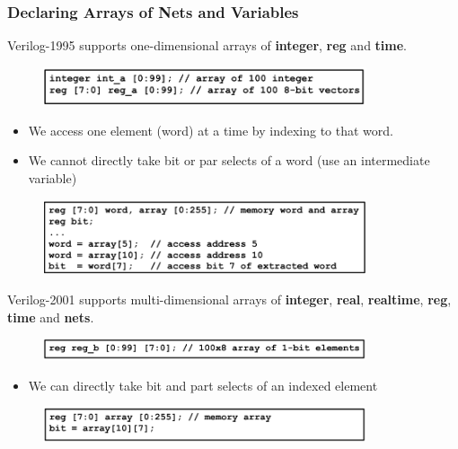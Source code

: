 \documentclass[t, notes, xcolor=table]{beamer}
\begin{document}
\begin{frame}
\frametitle{Declaring Arrays of Nets and Variables}
\scriptsize{
Verilog-1995 supports one-dimensional arrays of \textbf{integer}, \textbf{reg} and \textbf{time}.
\begin{figure}
    \includegraphics[width=0.85\textwidth, left]{img/04_array0.png}
\end{figure}

\begin{itemize}
\item We access one element (word) at a time by indexing to that word.
\item We cannot directly take bit or par selects of a word (use an intermediate variable)
\end{itemize}
\begin{figure}
    \includegraphics[width=0.85\textwidth, left]{img/04_array1.png}
\end{figure}

Verilog-2001 supports multi-dimensional arrays of \textbf{integer}, \textbf{real}, \textbf{realtime}, \textbf{reg}, \textbf{time} and \textbf{nets}.
\begin{figure}
    \includegraphics[width=0.85\textwidth, left]{img/04_array2.png}
\end{figure}
\begin{itemize}
\item We can directly take bit and part selects of an indexed element
\end{itemize}
\begin{figure}
    \includegraphics[width=0.85\textwidth, left]{img/04_array3.png}
\end{figure}
}
\end{frame}
\end{document}
